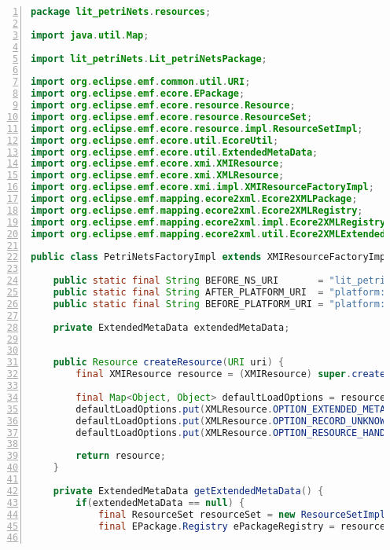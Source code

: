 \begin{lstlisting}[basicstyle=\ttfamily\footnotesize, flexiblecolumns=true, numbers=left, nolol=true, caption=Resource factory for migrating Petri net models., label=lst:petri_nets_resource_factory, language=Java, tabsize=2]
package lit_petriNets.resources;

import java.util.Map;

import lit_petriNets.Lit_petriNetsPackage;

import org.eclipse.emf.common.util.URI;
import org.eclipse.emf.ecore.EPackage;
import org.eclipse.emf.ecore.resource.Resource;
import org.eclipse.emf.ecore.resource.ResourceSet;
import org.eclipse.emf.ecore.resource.impl.ResourceSetImpl;
import org.eclipse.emf.ecore.util.EcoreUtil;
import org.eclipse.emf.ecore.util.ExtendedMetaData;
import org.eclipse.emf.ecore.xmi.XMIResource;
import org.eclipse.emf.ecore.xmi.XMLResource;
import org.eclipse.emf.ecore.xmi.impl.XMIResourceFactoryImpl;
import org.eclipse.emf.mapping.ecore2xml.Ecore2XMLPackage;
import org.eclipse.emf.mapping.ecore2xml.Ecore2XMLRegistry;
import org.eclipse.emf.mapping.ecore2xml.impl.Ecore2XMLRegistryImpl;
import org.eclipse.emf.mapping.ecore2xml.util.Ecore2XMLExtendedMetaData;

public class PetriNetsFactoryImpl extends XMIResourceFactoryImpl {

	public static final String BEFORE_NS_URI       = "lit_petriNets";
	public static final String AFTER_PLATFORM_URI  = "platform:/plugin/petrinets/model/After.ecore";
	public static final String BEFORE_PLATFORM_URI = "platform:/plugin/petrinets/model/Before_2_After.ecore2xml";

	private ExtendedMetaData extendedMetaData;
	
	
	public Resource createResource(URI uri) {
		final XMIResource resource = (XMIResource) super.createResource(uri);

		final Map<Object, Object> defaultLoadOptions = resource.getDefaultLoadOptions();
		defaultLoadOptions.put(XMLResource.OPTION_EXTENDED_META_DATA,     getExtendedMetaData());
		defaultLoadOptions.put(XMLResource.OPTION_RECORD_UNKNOWN_FEATURE, Boolean.TRUE);
		defaultLoadOptions.put(XMLResource.OPTION_RESOURCE_HANDLER,       new PetriNetsResourceHandler());
		
		return resource;
	}
	
	private ExtendedMetaData getExtendedMetaData() {
		if(extendedMetaData == null) {
			final ResourceSet resourceSet = new ResourceSetImpl();
			final EPackage.Registry ePackageRegistry = resourceSet.getPackageRegistry();
			

\end{lstlisting}
